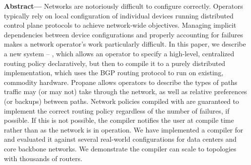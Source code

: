 \textbf{Abstract---}
Networks are notoriously difficult to configure correctly. 
Operators typically rely on local configuration of individual devices running 
distributed control plane protocols to achieve network-wide objectives. 
Managing implicit dependencies between device configurations and properly accounting for failures makes 
a network operator's work particularly difficult. 
%
%
In this paper, we describe a new system -- \sysname, which allows an operator to specify a high-level, 
centralized routing policy declaratively, but then to compile it to a purely distributed 
implementation, which uses the BGP routing protocol to run on existing, commodity hardware. 
%
Propane allows operators to describe the types of paths traffic may (or may not) take 
through the network, as well as relative preferences (or backups) between paths. 
%
Network policies compiled with \sysname are guaranteed to implement the correct routing policy regardless of the number of failures, if possible.  If this is not possible, the compiler notifies the user at compile time rather than as the network is in 
operation.
%
%
We have implemented a compiler for \sysname and evaluated it against several real-world configurations for data centers and core backbone networks. We demonstrate the \sysname compiler can scale to 
topologies with thousands of routers.

